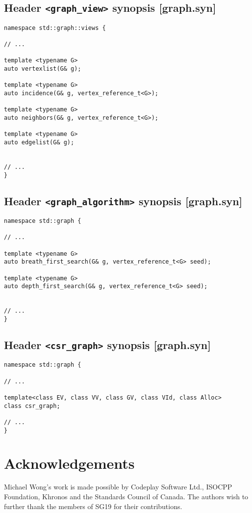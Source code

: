 \documentclass[10pt,onecolumn]{article}
\begin{document}
\subsection{Header \texttt{<graph\_view>} synopsis [graph.syn]}

\begin{lstlisting}
namespace std::graph::views {

// ...

template <typename G>
auto vertexlist(G& g);

template <typename G>
auto incidence(G& g, vertex_reference_t<G>);

template <typename G>
auto neighbors(G& g, vertex_reference_t<G>);

template <typename G>
auto edgelist(G& g);


// ...
}
\end{lstlisting}

\subsection{Header \texttt{<graph\_algorithm>} synopsis [graph.syn]}

\begin{lstlisting}
namespace std::graph {

// ...

template <typename G>
auto breath_first_search(G& g, vertex_reference_t<G> seed);

template <typename G>
auto depth_first_search(G& g, vertex_reference_t<G> seed);


// ...
}
\end{lstlisting}

\subsection{Header \texttt{<csr\_graph>} synopsis [graph.syn]}

\begin{lstlisting}
namespace std::graph {

// ...

template<class EV, class VV, class GV, class VId, class Alloc>
class csr_graph;

// ...
}
\end{lstlisting}


\section{Acknowledgements}
Michael Wong's work is made possible by Codeplay Software Ltd., ISOCPP Foundation, Khronos and the Standards Council of Canada.  The authors wish to further thank the members of SG19 for their contributions.

\footnotesize


\normalsize
\end{document}
